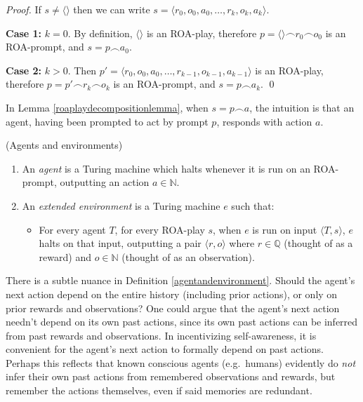 \documentclass[runningheads]{llncs}
\begin{document}
\begin{proof}
    If $s\not=\langle\rangle$ then we can write
    $s=\langle r_0,o_0,a_0,\ldots,r_k,o_k,a_k \rangle$.

    \textbf{Case 1:}
    $k=0$. By definition, $\langle\rangle$ is an ROA-play,
    therefore $p=\langle\rangle\frown r_0\frown o_0$ is an ROA-prompt,
    and $s=p\frown a_0$.

    \textbf{Case 2:} $k>0$.
    Then $p'=\langle r_0,o_0,a_0,\ldots,r_{k-1},o_{k-1},a_{k-1}\rangle$ is an ROA-play,
    therefore $p=p'\frown r_k\frown o_k$ is an ROA-prompt,
    and $s=p\frown a_k$.
    \qed
\end{proof}

In Lemma \ref{roaplaydecompositionlemma}, when
$s=p\frown a$, the intuition is that an agent, having been prompted to act by
prompt $p$, responds with action $a$.

\begin{definition}
\label{agentandenvironment}
(Agents and environments)
    \begin{enumerate}
    \item An \emph{agent} is a Turing machine which
    halts whenever it is run on an ROA-prompt, outputting
    an action $a\in\mathbb N$.
    \item An \emph{extended environment} is a Turing machine $e$ such that:
        \begin{itemize}
            \item
            For every agent $T$, for every
            ROA-play $s$,
            when $e$ is run on input $\langle T,s\rangle$, $e$ halts on that input,
            outputting a pair $\langle r,o\rangle$ where $r\in\mathbb Q$ (thought of
            as a reward) and $o\in\mathbb N$ (thought of as an observation).
        \end{itemize}
    \end{enumerate}
\end{definition}

There is a subtle nuance in Definition \ref{agentandenvironment}. Should the agent's
next action depend on the entire history (including prior actions), or only on prior
rewards and observations? One could argue that
the agent's next action needn't depend on its own past actions, since its own past actions
can be inferred from past rewards and observations.
In incentivizing self-awareness, it is convenient for the agent's
next action to formally depend on past actions. Perhaps this reflects that known
conscious agents (e.g.\ humans)
evidently do \emph{not} infer their own
past actions from remembered observations and rewards, but
remember the actions themselves, even if said memories are redundant.
\end{document}
